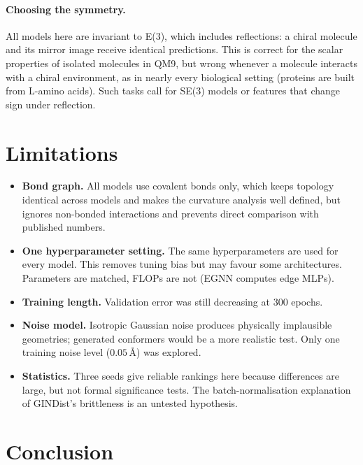 \documentclass[11pt,a4paper]{article}
\begin{document}
\paragraph{Choosing the symmetry.} All models here are invariant to E(3), which includes
reflections: a chiral molecule and its mirror image receive identical predictions. This is
correct for the scalar properties of isolated molecules in QM9, but wrong whenever a molecule
interacts with a chiral environment, as in nearly every biological setting (proteins are built
from L-amino acids). Such tasks call for SE(3) models or features that change sign under
reflection.

\section{Limitations}

\begin{itemize}
  \item \textbf{Bond graph.} All models use covalent bonds only, which keeps topology
        identical across models and makes the curvature analysis well defined, but ignores
        non-bonded interactions and prevents direct comparison with published numbers.
  \item \textbf{One hyperparameter setting.} The same hyperparameters are used for every model.
        This removes tuning bias but may favour some architectures. Parameters are matched,
        FLOPs are not (EGNN computes edge MLPs).
  \item \textbf{Training length.} Validation error was still decreasing at 300 epochs.
  \item \textbf{Noise model.} Isotropic Gaussian noise produces physically implausible
        geometries; generated conformers would be a more realistic test. Only one training
        noise level ($0.05$\,\AA{}) was explored.
  \item \textbf{Statistics.} Three seeds give reliable rankings here because differences are
        large, but not formal significance tests. The batch-normalisation explanation of
        GINDist's brittleness is an untested hypothesis.
\end{itemize}

\section{Conclusion}
\end{document}
